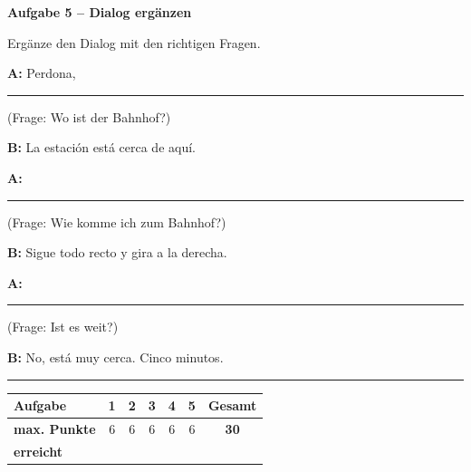 \documentclass[11pt, a4paper]{article}
\newcommand{\fachfarbe}{spanisch}
\newcommand{\punktebox}[1]{\hfill\fbox{\small \_\_\_/#1}}
\newcommand{\luecke}[1]{\rule{#1}{0.4pt}}
\newenvironment{aufgabe}[1]{%
    \needspace{5\baselineskip}%
    \nopagebreak[4]%
    \vspace{10pt}
    \noindent\textbf{\textcolor{\fachfarbe}{Aufgabe #1}}
    \nopagebreak[4]%
    \vspace{5pt}
    \nopagebreak[4]%
    \begin{list}{}{\leftmargin=0pt}
    \item[]
}{%
    \end{list}
}
\begin{document}
\vspace{15pt}


\begin{aufgabe}{5 -- Dialog ergänzen}
Ergänze den Dialog mit den richtigen Fragen. \punktebox{6}
\end{aufgabe}

\begin{tcolorbox}[colback=hellgrau, colframe=grau, boxrule=0.5pt, arc=0pt]
\noindent
\textbf{A:} Perdona, \luecke{6cm} \hfill (Frage: Wo ist der Bahnhof?)

\vspace{0.5em}

\noindent
\textbf{B:} La estación está cerca de aquí.

\vspace{0.8em}

\noindent
\textbf{A:} \luecke{6cm} \hfill (Frage: Wie komme ich zum Bahnhof?)

\vspace{0.5em}

\noindent
\textbf{B:} Sigue todo recto y gira a la derecha.

\vspace{0.8em}

\noindent
\textbf{A:} \luecke{6cm} \hfill (Frage: Ist es weit?)

\vspace{0.5em}

\noindent
\textbf{B:} No, está muy cerca. Cinco minutos.
\end{tcolorbox}


\vspace{25pt}
\hrule
\vspace{10pt}

\noindent
\begin{tabularx}{\textwidth}{|X|c|c|c|c|c||c|}
\hline
\textbf{Aufgabe} & 1 & 2 & 3 & 4 & 5 & \textbf{Gesamt} \\
\hline
\textbf{max. Punkte} & 6 & 6 & 6 & 6 & 6 & \textbf{30} \\
\hline
\textbf{erreicht} & & & & & & \\[0.8em]
\hline
\end{tabularx}
\end{document}
